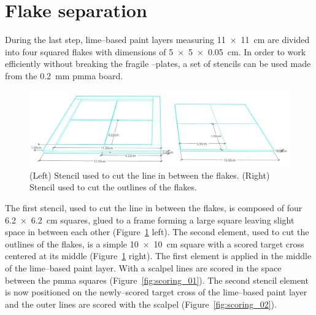 \documentclass[review]{elsarticle}
\begin{document}
\section{Flake separation}

During the last step, lime--based paint layers measuring \SI[product-units = single]{11 x 11}{\cm} are divided into four squared flakes with dimensions of \SI[product-units = single]{5 x 5 x 0.05}{\cm}.
In order to work efficiently without breaking the fragile --plates, a set of stencils can be used made from the \SI{0.2}{\mm} \gls{pmma} board.

\begin{figure}[htb]
  \centering
  \includegraphics[width=\textwidth]{stencil_00}
  \caption{(Left) Stencil used to cut the line in between the flakes. (Right) Stencil used to cut the outlines of the flakes.}
  \label{fig:stencil_00}
\end{figure}

The first stencil, used to cut the line in between the flakes, is composed of four \SI[product-units = single]{6.2 x 6.2}{\cm} squares, glued to a frame forming a large square leaving slight space in between each other (Figure~\ref{fig:stencil_00} left).
The second element, used to cut the outlines of the flakes, is a simple \SI[product-units = single]{10 x 10}{\cm} square with a scored target cross centered at its middle (Figure~\ref{fig:stencil_00} right).
The first element is applied in the middle of the lime--based paint layer.
With a scalpel lines are scored in the space between the \gls{pmma} squares (Figure~\ref{fig:scoring_01}).
The second stencil element is now positioned on the newly--scored target cross of the lime--based paint layer and the outer lines are scored with the scalpel (Figure~\ref{fig:scoring_02}).
\end{document}
